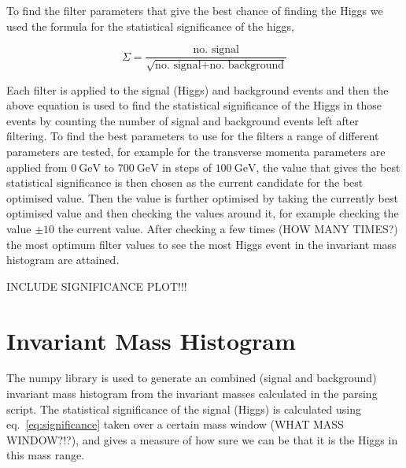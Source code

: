 \documentclass[11pt]{amsart}
\begin{document}
\begin{multicols}{2}
To find the filter parameters that give the best chance of finding the Higgs we used the formula for the statistical significance of the higgs,

\begin{equation}
  \label{eq:significance}
  \Sigma = \frac{\text{no. signal}}{\sqrt{\text{no. signal} + \text{no. background}}}
\end{equation}

Each filter is applied to the signal (Higgs) and background events and then the above equation is used to find the statistical significance of the Higgs in those events by counting the number of signal and background events left after filtering. To find the best parameters to use for the filters a range of different parameters are tested, for example for the transverse momenta parameters are applied from $\SI{0}{\giga\electronvolt}$ to $\SI{700}{\giga\electronvolt}$ in steps of $\SI{100}{\giga\electronvolt}$, the value that gives the best statistical significance is then chosen as the current candidate for the best optimised value. Then the value is further optimised by taking the currently best optimised value and then checking the values around it, for example checking the value $\pm 10$ the current value. After checking a few times (HOW MANY TIMES?) the most optimum filter values to see the most Higgs event in the invariant mass histogram are attained.

INCLUDE SIGNIFICANCE PLOT!!!


\section{Invariant Mass Histogram}

The numpy library is used to generate an combined (signal and background) invariant mass histogram from the invariant masses calculated in the parsing script. The statistical significance of the signal (Higgs) is calculated using eq.~\ref{eq:significance} taken over a certain mass window (WHAT MASS WINDOW?!?), and gives a measure of how sure we can be that it is the Higgs in this mass range.


\end{multicols}
\end{document}
